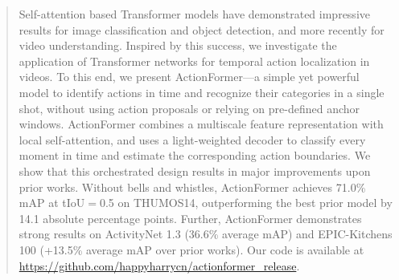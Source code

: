 \begin{abstract}
Self-attention based Transformer models have demonstrated impressive results for image classification and object detection, and more recently for video understanding. Inspired by this success, we investigate the application of Transformer networks for temporal action localization in videos. To this end, we present ActionFormer---a simple yet powerful model to identify actions in time and recognize their categories in a single shot, without using action proposals or relying on pre-defined anchor windows. ActionFormer combines a multiscale feature representation with local self-attention, and uses a light-weighted decoder to classify every moment in time and estimate the corresponding action boundaries. We show that this orchestrated design results in major improvements upon prior works. Without bells and whistles, ActionFormer achieves 71.0\% mAP at tIoU$=$0.5 on THUMOS14, outperforming the best prior model by 14.1 absolute percentage points. Further, ActionFormer demonstrates strong results on ActivityNet 1.3 (36.6\% average mAP) and EPIC-Kitchens 100 (+13.5\% average mAP over prior works). Our code is available at \url{https://github.com/happyharrycn/actionformer_release}. 
\end{abstract}